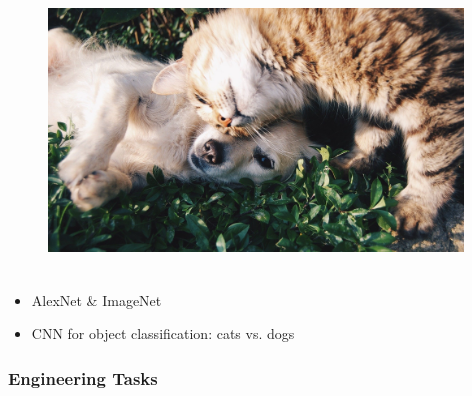 \documentclass{beamer}
\begin{document}
\begin{frame}
\frametitle{}%
\begin{figure}[h]
\includegraphics[width=11cm]{img/catDog-pixabay01.jpg}
\caption{ ~\parencite{imageCatDog}}
\end{figure}
\begin{itemize}
\item  AlexNet \& ImageNet~\parencite{krizhevsky2012imagenet}
\item CNN for object classification: cats vs. dogs 
\end{itemize}
\end{frame}


\begin{frame}
\frametitle{Engineering Tasks}%
\begin{figure}[h]
\centering
{}%
\caption{ ~\parencite{carSpeeding}}
\end{figure}
\end{frame}
\end{document}
